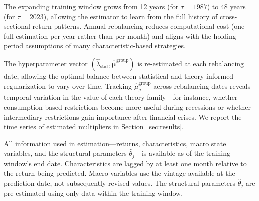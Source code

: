 The expanding training window grows from 12 years (for $\tau = 1987$) to 48 years (for $\tau = 2023$), allowing the estimator to learn from the full history of cross-sectional return patterns.
Annual rebalancing reduces computational cost (one full estimation per year rather than per month) and aligns with the holding-period assumptions of many characteristic-based strategies.

The hyperparameter vector $(\hat{\lambda}_{\mathrm{stat}}, \hat{\bm{\mu}}^{\mathrm{group}})$ is re-estimated at each rebalancing date, allowing the optimal balance between statistical and theory-informed regularization to vary over time.
Tracking $\hat{\mu}_g^{\mathrm{group}}$ across rebalancing dates reveals temporal variation in the value of each theory family---for instance, whether consumption-based restrictions become more useful during recessions or whether intermediary restrictions gain importance after financial crises.
We report the time series of estimated multipliers in Section~\ref{sec:results}.

All information used in estimation---returns, characteristics, macro state variables, and the structural parameters $\hat{\theta}_j$---is available as of the training window's end date.
Characteristics are lagged by at least one month relative to the return being predicted.
Macro variables use the vintage available at the prediction date, not subsequently revised values.
The structural parameters $\hat{\theta}_j$ are pre-estimated using only data within the training window.
